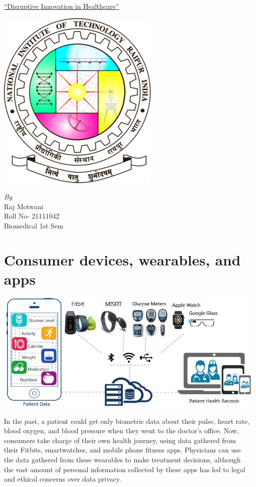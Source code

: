 \documentclass[12pt]{article}
\begin{document}
\begin{center}
\huge\underline{``Disruptive Innovation in Healthcare''}
\end{center}
\begin{center}
 \includegraphics[scale=0.8]{nitlogo.png }
\end{center}
\vspace{1cm}
\begin{center}
   \emph{\large By}\\
\Large{Raj Motwani }\\
\large{Roll No- 21111042}\\
\large{Biomedical 1st Sem}\\
\end{center}
\clearpage
\section{ Consumer devices, wearables, and apps  }

 \includegraphics[scale=0.5]{app.jpg }

In the past, a patient could get only biometric data about their pulse, heart rate, blood oxygen, and blood pressure when they went to the doctor’s office. Now, consumers take charge of their own health journey, using data gathered from their Fitbits, smartwatches, and mobile phone fitness apps. Physicians can use the data gathered from these wearables to make treatment decisions, although the vast amount of personal information collected by these apps has led to legal and ethical concerns over data privacy.
\end{document}

